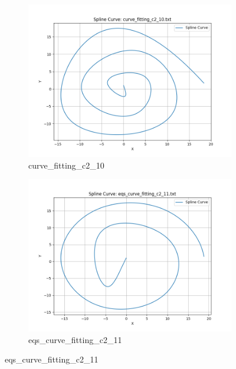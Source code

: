 \documentclass[a4paper]{article}
\begin{document}
\begin{figure}[htbp]
\begin{subfigure}[t]{0.24\textwidth}
      \includegraphics[width=\textwidth]{figures/E/curve_fitting_c2_10.png}
      \caption*{curve\_fitting\_c2\_10}
  \end{subfigure}
  \begin{subfigure}[t]{0.24\textwidth}
      \centering
      \includegraphics[width=\textwidth]{figures/E/eqs_curve_fitting_c2_11.png}
      \caption*{eqs\_curve\_fitting\_c2\_11}
  \end{subfigure}


\end{figure}
\end{document}
